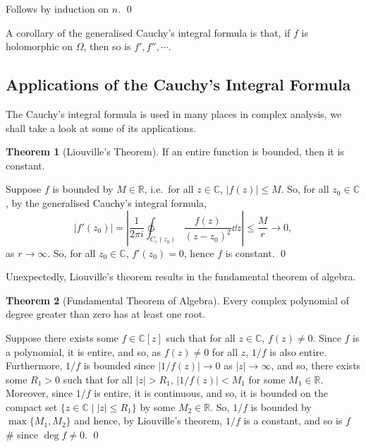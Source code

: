 \documentclass[
]{article}
\theoremstyle{definition}
\newtheorem{theorem}{Theorem}
\theoremstyle{definition}
\begin{document}
Follows by induction on \(n\). \qed

A corollary of the generalised Cauchy's integral formula is that, if
\(f\) is holomorphic on \(\Omega\), then so is \(f', f'', \cdots\).

\hypertarget{applications-of-the-cauchys-integral-formula}{%
\subsection{Applications of the Cauchy's Integral
Formula}\label{applications-of-the-cauchys-integral-formula}}

The Cauchy's integral formula is used in many places in complex
analysis, we shall take a look at some of its applications.

\begin{theorem}[Liouville's Theorem]
  If an entire function is bounded, then it is constant.
\end{theorem}
\proof

Suppose \(f\) is bounded by \(M \in \mathbb{R}\), i.e.~for all
\(z \in \mathbb{C}\), \(|f(z)| \le M\). So, for all
\(z_0 \in \mathbb{C}\), by the generalised Cauchy's integral formula,
\[|f'(z_0)| = \left|\frac{1}{2\pi i} \ointctrclockwise_{C_r(z_0)} 
    \frac{f(z)}{(z - z_0)^2} \dd z\right|
    \le \frac{M}{r} \to 0,\] as \(r \to \infty\). So, for all
\(z_0 \in \mathbb{C}\), \(f'(z_0) = 0\), hence \(f\) is constant. \qed

Unexpectedly, Liouville's theorem results in the fundamental theorem of
algebra.

\begin{theorem}[Fundamental Theorem of Algebra]
  Every complex polynomial of degree greater than zero has at least one root.
\end{theorem}
\proof

Suppose there exists some \(f \in \mathbb{C}[z]\) such that for all
\(z \in \mathbb{C}\), \(f(z) \neq 0\). Since \(f\) is a polynomial, it
is entire, and so, as \(f(z) \neq 0\) for all \(z\), \(1 / f\) is also
entire. Furthermore, \(1 / f\) is bounded since \(|1 / f(z)| \to 0\) as
\(|z| \to \infty\), and so, there exists some \(R_1 > 0\) such that for
all \(|z| > R_1\), \(|1 / f(z)| < M_1\) for some \(M_1 \in \mathbb{R}\).
Moreover, since \(1 / f\) is entire, it is continuous, and so, it is
bounded on the compact set \(\{z \in \mathbb{C} \mid |z| \le R_1\}\) by
some \(M_2 \in \mathbb{R}\). So, \(1 / f\) is bounded by
\(\max\{M_1, M_2\}\) and hence, by Liouville's theorem, \(1 / f\) is a
constant, and so is \(f\) \# since \(\deg f \neq 0\). \qed
\end{document}
